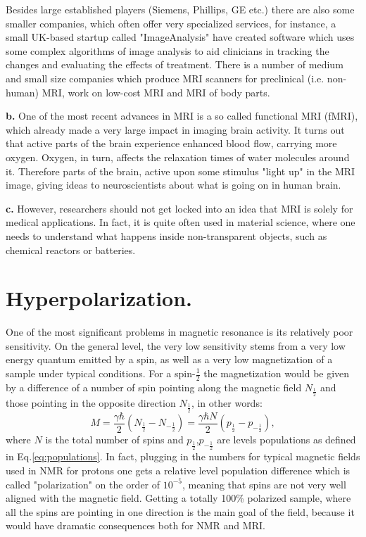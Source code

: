 \documentclass[a4paper, 12pt]{article}
\begin{document}
  Besides large established players (Siemens, Phillips, GE etc.) there are also some smaller companies, which often offer very specialized services, for instance, a small UK-based startup called "ImageAnalysis" have created software which uses some complex algorithms of image analysis to aid clinicians in tracking the changes and evaluating the effects of treatment.
  There is a number of medium and small size companies which produce MRI scanners for preclinical (i.e. non-human) MRI, work on low-cost MRI and MRI of body parts. 

  \textbf{b.} One of the most recent advances in MRI is a so called functional MRI (fMRI), which already made a very large impact in imaging brain activity. It turns out that active parts of the brain experience enhanced blood flow, carrying more oxygen. Oxygen, in turn, affects the relaxation times of water molecules around it. Therefore parts of the brain, active upon some stimulus "light up" in the MRI image, giving ideas to neuroscientists about what is going on in human brain.

  \textbf{c.} However, researchers should not get locked into an idea that MRI is solely for medical applications. In fact, it is quite often used in material science, where one needs to understand what happens inside non-transparent objects, such as chemical reactors or batteries.
  
\section{Hyperpolarization.}

  One of the most significant problems in magnetic resonance is its relatively poor sensitivity. On the general level, the very low sensitivity stems from  a very low energy quantum emitted by a spin, as well as a very low magnetization of a sample under typical conditions. For a spin-$\frac{1}{2}$ the magnetization would be given by a difference of a number of spin pointing along the magnetic field $N_{\frac{1}{2}}$ and those pointing in the opposite direction $N_{\frac{1}{2}}$, in other words:
  \begin{equation}
  M = \dfrac{\gamma \hbar}{2} ( N_{\frac{1}{2}} - N_{-\frac{1}{2}}) = \dfrac{\gamma \hbar N}{2}  (p_{\frac{1}{2}} - p_{-\frac{1}{2}}),  
  \end{equation}
  where $N$ is the total number of spins and $p_{\frac{1}{2}}$,$p_{-\frac{1}{2}}$ are levels populations as defined in Eq.\ref{eq:populations}. In fact, plugging in the numbers for typical magnetic fields used in NMR for protons one gets a relative level population difference which is called "polarization" on the order of $10^{-5}$, meaning that spins are not very well aligned with the magnetic field. Getting a totally 100\% polarized sample, where all the spins are pointing in one direction is the main goal of the field, because it would have dramatic consequences both for NMR and MRI.
  
\end{document}
